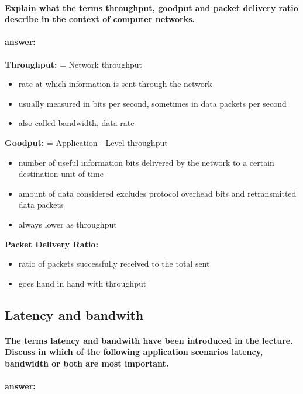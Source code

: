 \documentclass[a4paper,12pt]{article}
\begin{document}
 \paragraph{Explain what the terms throughput, goodput and packet delivery ratio describe in the context of computer networks.}
 \paragraph{answer:}
 
 \textbf{Throughput:} = Network throughput \\
 \begin{itemize}[itemsep=0pt]
 	\item  rate at which information is sent through the network
 	\item  usually measured in bits per second, sometimes in data packets per second
 	\item  also called bandwidth, data rate
 \end{itemize}

 \textbf{Goodput:}  = Application - Level throughput
 \begin{itemize}[itemsep=0pt]
 	 \item  number of useful information bits delivered by the network to a certain destination unit of time
 	\item  amount of data considered excludes protocol overhead bits and retransmitted data packets
 	\item  always lower as throughput
 \end{itemize}

 \textbf{Packet Delivery Ratio:}
 \begin{itemize}[itemsep=0pt]
 	\item  ratio of packets successfully received to the total sent
 	\item  goes hand in hand with throughput
 \end{itemize}
  
 
  \subsection{Latency and bandwith}
 \paragraph{The terms latency and bandwith have been introduced in the lecture. Discuss in which of the following application scenarios latency, bandwidth or both are most important.}
 \paragraph{answer:}
\end{document}
